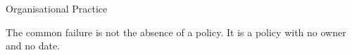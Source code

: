 \begin{frame}{Organisational Practice}
    \vspace{0.8em}
    \begin{block}{}
        \centering
        \small The common failure is not the absence of a policy. It is a policy with no owner and
        no date.
    \end{block}
\end{frame}


